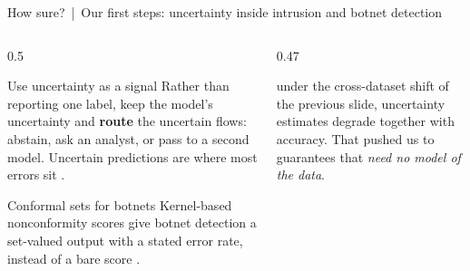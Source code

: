 \documentclass[aspectratio=169,10pt]{beamer}
\begin{document}
\begin{frame}{How sure? \,|\, Our first steps: uncertainty inside intrusion and botnet detection}
\begin{columns}[T]
\begin{column}{0.5\textwidth}
\begin{block}{Use uncertainty as a signal}
{\footnotesize Rather than reporting one label, keep the model's uncertainty and \textbf{route} the uncertain flows: abstain, ask an analyst, or pass to a second model. Uncertain predictions are where most errors sit .}
\end{block}
\begin{block}{Conformal sets for botnets}
{\footnotesize Kernel-based nonconformity scores give botnet detection a set-valued output with a stated error rate, instead of a bare score .}
\end{block}
\end{column}
\begin{column}{0.47\textwidth}
\begin{sfig}[0.6]
\end{sfig}
\vspace{1mm}

{\footnotesize{} under the cross-dataset shift of the previous slide, uncertainty estimates degrade together with accuracy. That pushed us to guarantees that \emph{need no model of the data}.}
\end{column}
\end{columns}
\end{frame}
\end{document}
